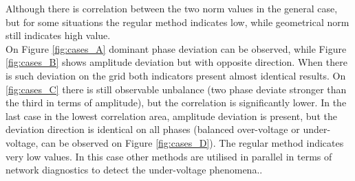             Although there is correlation between the two norm values in the general case, but for some situations the regular method indicates low, while geometrical norm still indicates high value.\\
            On Figure \ref{fig:cases_A} dominant phase deviation can be observed, while Figure \ref{fig:cases_B} shows amplitude deviation but with opposite direction. When there is such deviation on the grid both indicators present almost identical results. On \ref{fig:cases_C} there is still observable unbalance (two phase deviate stronger than the third in terms of amplitude), but the correlation is significantly lower. In the last case in the lowest correlation area, amplitude deviation is present, but the deviation direction is identical on all phases (balanced over-voltage or under-voltage, can be observed on Figure \ref{fig:cases_D}). The regular method indicates very low values. In this case other methods are utilised in parallel in terms of network diagnostics to detect the under-voltage phenomena.\cite{arn1997under-voltage}.



